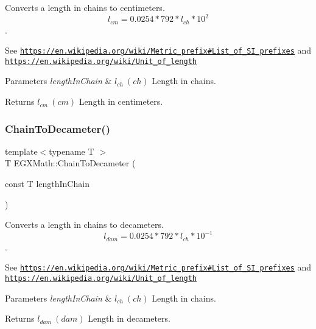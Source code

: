 Converts a length in chains to centimeters. \[ l_{cm}=0.0254 * 792 * l_{ch} * 10^{2} \]. 

See \href{https://en.wikipedia.org/wiki/Metric_prefix#List_of_SI_prefixes}{\tt https\+://en.\+wikipedia.\+org/wiki/\+Metric\+\_\+prefix\#\+List\+\_\+of\+\_\+\+S\+I\+\_\+prefixes} and \href{https://en.wikipedia.org/wiki/Unit_of_length}{\tt https\+://en.\+wikipedia.\+org/wiki/\+Unit\+\_\+of\+\_\+length} 
\begin{DoxyParams}{Parameters}
{\em length\+In\+Chain} & $ l_{ch}\ (ch)$ Length in chains. \\
\hline
\end{DoxyParams}
\begin{DoxyReturn}{Returns}
$ l_{cm}\ (cm)$ Length in centimeters. 
\end{DoxyReturn}
\mbox{\label{group___e_g_x_math-_conversions-_length_conversions-_surveyors-_chain-_s_i_gaabde0350f3af15795de0adeac2ec9e28}} 
\subsubsection{\texorpdfstring{Chain\+To\+Decameter()}{ChainToDecameter()}}
{\footnotesize\ttfamily template$<$typename T $>$ \\
T E\+G\+X\+Math\+::\+Chain\+To\+Decameter (\begin{DoxyParamCaption}\item[{const T}]{length\+In\+Chain }\end{DoxyParamCaption})}



Converts a length in chains to decameters. \[ l_{dam}=0.0254 * 792 * l_{ch} * 10^{-1} \]. 

See \href{https://en.wikipedia.org/wiki/Metric_prefix#List_of_SI_prefixes}{\tt https\+://en.\+wikipedia.\+org/wiki/\+Metric\+\_\+prefix\#\+List\+\_\+of\+\_\+\+S\+I\+\_\+prefixes} and \href{https://en.wikipedia.org/wiki/Unit_of_length}{\tt https\+://en.\+wikipedia.\+org/wiki/\+Unit\+\_\+of\+\_\+length} 
\begin{DoxyParams}{Parameters}
{\em length\+In\+Chain} & $ l_{ch}\ (ch)$ Length in chains. \\
\hline
\end{DoxyParams}
\begin{DoxyReturn}{Returns}
$ l_{dam}\ (dam)$ Length in decameters. 
\end{DoxyReturn}
\mbox{\label{group___e_g_x_math-_conversions-_length_conversions-_surveyors-_chain-_s_i_ga9311e5452f0bd1f79f95e43085ad6412}} 
